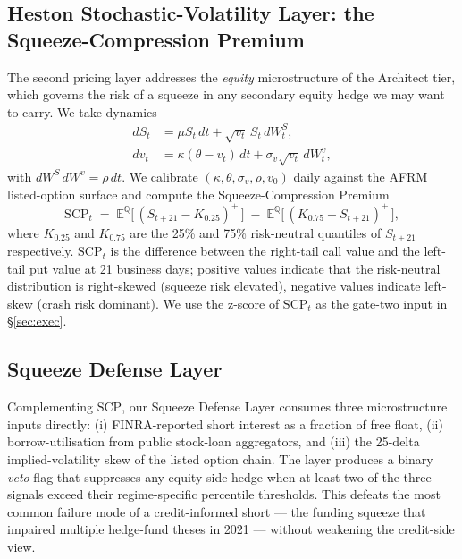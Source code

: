 \documentclass[11pt,letterpaper]{article}
\newcommand{\scp}{\text{SCP}}
\begin{document}
\subsection{Heston Stochastic-Volatility Layer: the Squeeze-Compression Premium}

The second pricing layer addresses the \emph{equity} microstructure of
the Architect tier, which governs the risk of a squeeze in any
secondary equity hedge we may want to carry. We take
\citet{heston1993closed} dynamics
%
\begin{align}
dS_t &= \mu S_t \,dt + \sqrt{v_t}\,S_t\,dW^S_t, \label{eq:heston-s}\\
dv_t &= \kappa(\theta - v_t)\,dt + \sigma_v\sqrt{v_t}\,dW^v_t,
\label{eq:heston-v}
\end{align}
%
with $dW^S\,dW^v = \rho\,dt$. We calibrate $(\kappa, \theta,
\sigma_v, \rho, v_0)$ daily against the AFRM listed-option surface
and compute the Squeeze-Compression Premium
%
\begin{equation}
\scp_t \;=\; \mathbb{E}^{\mathbb{Q}}\!\bigl[\,(S_{t+21} - K_{0.25})^+\,\bigr]
\;-\;
\mathbb{E}^{\mathbb{Q}}\!\bigl[\,(K_{0.75} - S_{t+21})^+\,\bigr],
\label{eq:scp}
\end{equation}
%
where $K_{0.25}$ and $K_{0.75}$ are the 25\% and 75\% risk-neutral
quantiles of $S_{t+21}$ respectively. $\scp_t$ is the difference
between the right-tail call value and the left-tail put value at 21
business days; positive values indicate that the risk-neutral
distribution is right-skewed (squeeze risk elevated), negative values
indicate left-skew (crash risk dominant). We use the z-score of
$\scp_t$ as the gate-two input in \S\ref{sec:exec}.

\subsection{Squeeze Defense Layer}

Complementing $\scp$, our Squeeze Defense Layer consumes three
microstructure inputs directly: (i) FINRA-reported short interest as
a fraction of free float, (ii) borrow-utilisation from public stock-loan
aggregators, and (iii) the 25-delta implied-volatility skew of the
listed option chain. The layer produces a binary \emph{veto} flag
that suppresses any equity-side hedge when at least two of the three
signals exceed their regime-specific percentile thresholds. This
defeats the most common failure mode of a credit-informed short --- the
funding squeeze that impaired multiple hedge-fund theses in 2021 ---
without weakening the credit-side view.
\end{document}

